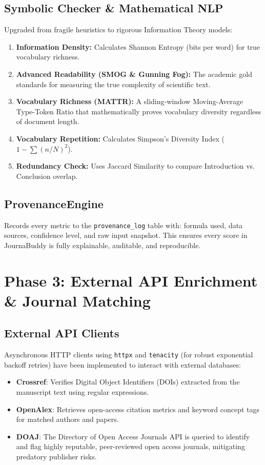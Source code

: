 \documentclass[11pt,a4paper]{article}
\begin{document}
\subsection*{Symbolic Checker \& Mathematical NLP}
Upgraded from fragile heuristics to rigorous Information Theory models:
\begin{enumerate}[leftmargin=*]
    \item \textbf{Information Density:} Calculates Shannon Entropy (bits per word) for true vocabulary richness.
    \item \textbf{Advanced Readability (SMOG \& Gunning Fog):} The academic gold standards for measuring the true complexity of scientific text.
    \item \textbf{Vocabulary Richness (MATTR):} A sliding-window Moving-Average Type-Token Ratio that mathematically proves vocabulary diversity regardless of document length.
    \item \textbf{Vocabulary Repetition:} Calculates Simpson's Diversity Index ($1 - \sum (n / N)^2$).
    \item \textbf{Redundancy Check:} Uses Jaccard Similarity to compare Introduction vs. Conclusion overlap.
\end{enumerate}

\subsection*{ProvenanceEngine}
Records every metric to the \texttt{provenance\_log} table with: formula used, data sources, confidence level, and raw input snapshot. This ensures every score in JournaBuddy is fully explainable, auditable, and reproducible.

\bigskip

\section{Phase 3: External API Enrichment \& Journal Matching}

\subsection*{External API Clients}
Asynchronous HTTP clients using \texttt{httpx} and \texttt{tenacity} (for robust exponential backoff retries) have been implemented to interact with external databases:
\begin{itemize}
    \item \textbf{Crossref}: Verifies Digital Object Identifiers (DOIs) extracted from the manuscript text using regular expressions.
    \item \textbf{OpenAlex}: Retrieves open-access citation metrics and keyword concept tags for matched authors and papers.
    \item \textbf{DOAJ}: The Directory of Open Access Journals API is queried to identify and flag highly reputable, peer-reviewed open access journals, mitigating predatory publisher risks.
\end{itemize}
\end{document}
